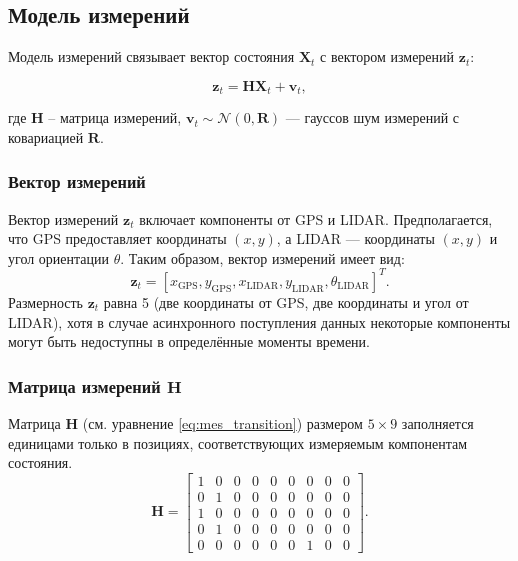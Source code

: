 \subsection{Модель измерений}
\label{sec:measurement_model}

Модель измерений связывает вектор состояния \(\mathbf{X}_t\) с вектором измерений \(\mathbf{z}_t\):

\begin{equation}
\mathbf{z}_t = \mathbf{H} \mathbf{X}_t + \mathbf{v}_t,
\label{eq:measurement_model}
\end{equation}

где \(\mathbf{H}\) -- матрица измерений,
\(\mathbf{v}_t \sim \mathcal{N}(0, \mathbf{R})\) --- гауссов шум измерений с ковариацией \(\mathbf{R}\).

\subsubsection{Вектор измерений}
\hfill
\label{subsec:measurement_vector}

Вектор измерений \(\mathbf{z}_t\) включает компоненты от GPS и LIDAR. Предполагается, что GPS предоставляет координаты \((x, y)\), а LIDAR --- координаты \((x, y)\) и угол ориентации \(\theta\). Таким образом, вектор измерений имеет вид:
\[
\mathbf{z}_t = [x_{\text{GPS}}, y_{\text{GPS}}, x_{\text{LIDAR}}, y_{\text{LIDAR}}, \theta_{\text{LIDAR}}]^T.
\]
Размерность \(\mathbf{z}_t\) равна 5 (две координаты от GPS, две координаты и угол от LIDAR), 
хотя в случае асинхронного поступления данных некоторые компоненты могут быть недоступны в определённые моменты времени.

\subsubsection{Матрица измерений \(\mathbf{H}\)}
\hfill
\label{subsec:measurement_matrix}

Матрица \(\mathbf{H}\) (см. уравнение \ref{eq:mes_transition}) размером \(5 \times 9\)
заполняется единицами только в позициях, соответствующих измеряемым компонентам состояния.
\begin{equation}
	\label{eq:mes_transition}
	\mathbf{H} =
	\begin{bmatrix}
	1 & 0 & 0 & 0 & 0 & 0 & 0 & 0 & 0 \\
	0 & 1 & 0 & 0 & 0 & 0 & 0 & 0 & 0 \\
	1 & 0 & 0 & 0 & 0 & 0 & 0 & 0 & 0 \\
	0 & 1 & 0 & 0 & 0 & 0 & 0 & 0 & 0 \\
	0 & 0 & 0 & 0 & 0 & 0 & 1 & 0 & 0
	\end{bmatrix}.
\end{equation}

